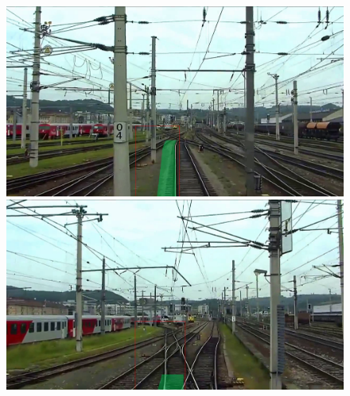 \begin{figure}[H]
\begin{minipage}{0.195\textwidth}
    \end{minipage}
    \hfill
    \begin{minipage}{0.195\textwidth}
        \includegraphics[width=\textwidth]{PICs/experiments/autocropExperiments/output_frames/frame_1600.png}
    \end{minipage}
    \hfill
    \begin{minipage}{0.195\textwidth}
        \includegraphics[width=\textwidth]{PICs/experiments/autocropExperiments/output_frames/frame_1900.png}
    \end{minipage}


\end{figure}
